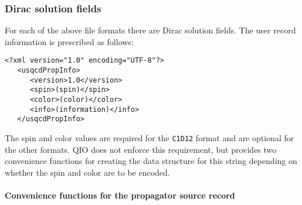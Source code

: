 \documentclass{article}
\begin{document}
\subsubsection{Dirac solution fields}

For each of the above file formats there are Dirac solution fields.
The user record information is prescribed as follows:

\begin{verbatim}
<?xml version="1.0" encoding="UTF-8"?>
   <usqcdPropInfo>
      <version>1.0</version>
      <spin>(spin)</spin>
      <color>(color)</color>
      <info>(information)</info>
   </usqcdPropInfo>
\end{verbatim}
%
The spin and color values are required for the \verb|C1D12| format and are
optional for the other formats.  QIO does not enforce this
requirement, but provides two convenience functions for creating the
data structure for this string depending on whether the spin and color
are to be encoded.

\paragraph{Convenience functions for the propagator source record}
\end{document}
